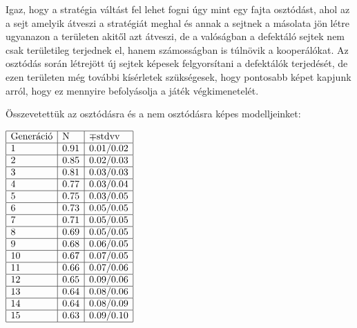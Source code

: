 Igaz, hogy a stratégia váltást fel lehet fogni úgy mint egy fajta osztódást, ahol az a sejt amelyik átveszi a stratégiát meghal és annak a sejtnek a másolata jön létre ugyanazon a területen akitől azt átveszi, de a valóságban a defektáló sejtek nem csak területileg terjednek el, hanem számosságban is túlnövik a kooperálókat.
Az osztódás során létrejött új sejtek képesek felgyorsítani a defektálók terjedését, de ezen területen még további kísérletek szükségesek, hogy pontosabb képet kapjunk arról, hogy ez mennyire befolyásolja a játék végkimenetelét.

Összevetettük az osztódásra és a nem osztódásra képes modelljeinket:

$
\begin{array}{ | l | l | l | }
\hline
	\text{Generáció} & \text{N} &  \mp\text{stdvv} \\ \hline
	1 & 0.91 & 0.01/0.02 \\ \hline
	2 & 0.85 & 0.02/0.03 \\ \hline
	3 & 0.81 & 0.03/0.03 \\ \hline
	4 & 0.77 & 0.03/0.04 \\ \hline
	5 & 0.75 & 0.03/0.05 \\ \hline
	6 & 0.73 & 0.05/0.05 \\ \hline
	7 & 0.71 & 0.05/0.05 \\ \hline
	8 & 0.69 & 0.05/0.05 \\ \hline
	9 & 0.68 & 0.06/0.05 \\ \hline
	10 & 0.67 & 0.07/0.05 \\ \hline
	11 & 0.66 & 0.07/0.06 \\ \hline
	12 & 0.65 & 0.09/0.06 \\ \hline
	13 & 0.64 & 0.08/0.06 \\ \hline
	14 & 0.64 & 0.08/0.09 \\ \hline
	15 & 0.63 & 0.09/0.10 \\ \hline
\end{array}
$

